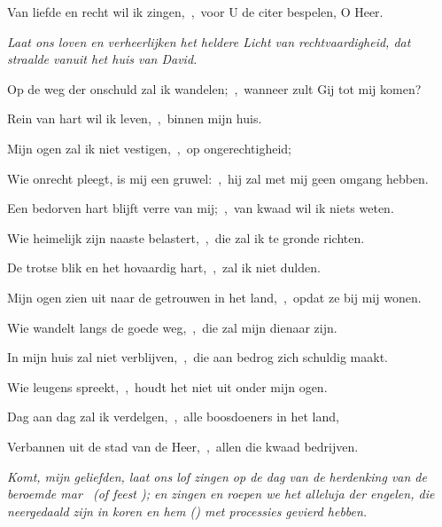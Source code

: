 \documentclass[12pt,twoside,a5paper]{article}
\begin{document}
\begin{halfparskip}
  Van liefde en recht wil ik zingen,~\sep\ voor U de citer bespelen, O Heer.


   \emph{Laat ons loven en verheerlijken het heldere Licht van rechtvaardigheid, dat straalde vanuit het huis van David.}

  Op de weg der onschuld zal ik wandelen;~\sep\ wanneer zult Gij tot mij komen?

  Rein van hart wil ik leven,~\sep\ binnen mijn huis.

  Mijn ogen zal ik niet vestigen,~\sep\ op ongerechtigheid;

  Wie onrecht pleegt, is mij een gruwel:~\sep\ hij zal met mij geen omgang hebben.

  Een bedorven hart blijft verre van mij;~\sep\ van kwaad wil ik niets weten.

  Wie heimelijk zijn naaste belastert,~\sep\ die zal ik te gronde richten.

  De trotse blik en het hovaardig hart,~\sep\ zal ik niet dulden.

  Mijn ogen zien uit naar de getrouwen in het land,~\sep\ opdat ze bij mij wonen.

  Wie wandelt langs de goede weg,~\sep\ die zal mijn dienaar zijn.

  In mijn huis zal niet verblijven,~\sep\ die aan bedrog zich schuldig maakt.

  Wie leugens spreekt,~\sep\ houdt het niet uit onder mijn ogen.

  Dag aan dag zal ik verdelgen,~\sep\ alle boosdoeners in het land,

  Verbannen uit de stad van de Heer,~\sep\ allen die kwaad bedrijven.
\end{halfparskip}

 \emph{Komt, mijn geliefden, laat ons lof zingen op de dag van de herdenking van de beroemde mar \NN\ (of feest \NN); en zingen en roepen we het alleluja der engelen, die neergedaald zijn in koren en hem () met processies gevierd hebben.}



\end{document}
